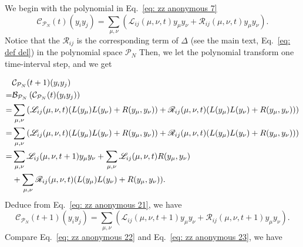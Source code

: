 \documentclass[journal=jctcce,a4paper,manuscript=article]{achemso}
\begin{document}
We begin with the polynomial in Eq.~\eqref{eq: zz anonymous 7}
\begin{equation}
  \label{eq: zz anonymous 21}
  \mathcal{C}_{\mathcal{P}_N} (t) (y_i y_j)
  =\sum_{\mu,\nu} \left(\mathscr{L}_{ij} (\mu, \nu, t) y_\mu y_\nu + \mathscr{R}_{ij} (\mu, \nu, t) y_\mu y_\nu\right).
\end{equation}
Notice that the $\mathscr{R}_{ij}$ is the corresponding term of $\Delta$ (see the main text, Eq.~\eqref{eq: def del}) in the polynomial space $\mathcal{P}_N$
Then, we let the polynomial transform one time-interval step, and we get

\begin{align}
    & \mathcal{C}_{\mathcal{P}_N} (t+1) (y_i y_j)                                                                                                                             \\
  = & \mathcal{B}_{\mathcal{P}_N}\left(\mathcal{C}_{\mathcal{P}_N} (t) (y_i y_j)\right)                                                                                                             \\
  = & \sum_{\mu,\nu} \left(\mathscr{L}_{ij} (\mu, \nu, t) (L(y_\mu) L(y_\nu) + R(y_\mu, y_\nu)) + \mathscr{R}_{ij} (\mu, \nu, t) (L(y_\mu) L(y_\nu) + R(y_\mu, y_\nu))\right) \\
  = & \sum_{\mu,\nu} \left(\mathscr{L}_{ij} (\mu, \nu, t) (L(y_\mu) L(y_\nu) + R(y_\mu, y_\nu)) + \mathscr{R}_{ij} (\mu, \nu, t) (L(y_\mu) L(y_\nu) + R(y_\mu, y_\nu))\right) \\
  = & \sum_{\mu,\nu} \mathscr{L}_{ij} (\mu, \nu, t+1) y_\mu y_\nu +  \sum_{\mu,\nu}\mathscr{L}_{ij} (\mu, \nu, t) R(y_\mu, y_\nu) \nonumber                                   \\
    & + \sum_{\mu,\nu}\mathscr{R}_{ij} (\mu, \nu, t) (L(y_\mu) L(y_\nu) + R(y_\mu, y_\nu)).
  \label{eq: zz anonymous 22}
\end{align}
Deduce from Eq.~\eqref{eq: zz anonymous 21}, we have
\begin{equation}
  \label{eq: zz anonymous 23}
  \mathcal{C}_{\mathcal{P}_N} (t+1) (y_i y_j)
  =\sum_{\mu,\nu} \left(\mathscr{L}_{ij} (\mu, \nu, t+1) y_\mu y_\nu + \mathscr{R}_{ij} (\mu, \nu, t+1) y_\mu y_\nu\right).
\end{equation}
Compare Eq.~\eqref{eq: zz anonymous 22} and Eq.~\eqref{eq: zz anonymous 23}, we have
\end{document}
